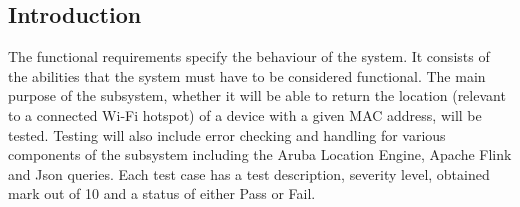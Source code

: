 \subsection{Introduction}
The functional requirements specify the behaviour of the system. It consists of the abilities that the system must have to be considered functional. The main purpose of the subsystem, whether it will be able to return the location (relevant to a connected Wi-Fi hotspot) of a device with a given MAC address, will be tested. Testing will also include error checking and handling for various components of the subsystem including the Aruba Location Engine, Apache Flink and Json queries. Each test case has a test description, severity level, obtained mark out of 10 and a status of either Pass or Fail.  
